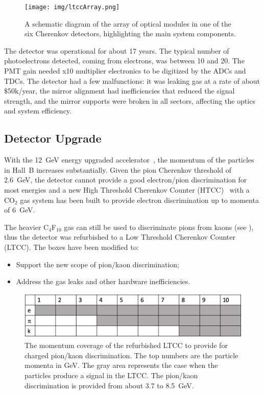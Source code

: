 \begin{figure}[ht]
	\centering
	\texttt{[image: img/ltccArray.png]}
	\caption{A schematic diagram of the array of optical modules in one of the six Cherenkov detectors, highlighting
          the main system components.}
	\label{fig:ltccArray}
\end{figure}

The detector was operational for about 17 years. The typical number of photoelectrons detected, coming from electrons, was between 10 and 20.
The PMT gain needed x10 multiplier electronics to be digitized by the ADCs and TDCs.
The detector had a few malfunctions: it was leaking gas at a rate of about $\$$50k/year, the mirror alignment had inefficiencies that reduced
the signal strength, and the mirror supports were broken in all sectors, affecting the optics and system efficiency.

\subsection{Detector Upgrade}

With the 12~GeV energy upgraded accelerator~\cite{TDR12}, the momentum of the particles in Hall~B increases
substantially. Given the pion Cherenkov threshold of 2.6~GeV, the detector cannot provide a good electron/pion
discrimination for most energies and a new High Threshold Cherenkov Counter (HTCC)~\cite{htcc-nim} with a
CO$_2$ gas system has been built to provide electron discrimination up to momenta of 6~GeV.

The heavier C$_4$F$_{10}$ gas can still be used to discriminate pions from kaons (see ), thus the detector was refurbished to a Low Threshold Cherenkov Counter (LTCC).
The boxes have been modified to:

\begin{itemize}
	\item Support the new scope of pion/kaon discrimination;
	\item Address the gas leaks and other hardware inefficiencies.
\end{itemize}

\begin{figure}[hb]
	\centering
	\includegraphics[width=0.99\columnwidth,keepaspectratio]{img/newScope.png}
	\caption{The momentum coverage of the refurbished LTCC to provide for charged pion/kaon discrimination.
             The top numbers are the particle momenta in GeV.
		     The gray area represents the case when the particles produce a signal in the LTCC.
			 The pion/kaon discrimination is provided from about 3.7 to 8.5~GeV.}
	\label{fig:newScope}
\end{figure}
